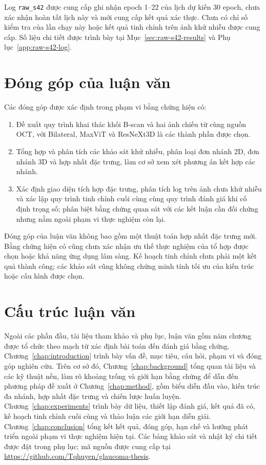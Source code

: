 \documentclass[14pt,a4paper,oneside]{extreport}
\begin{document}
Log \texttt{raw\_s42} được cung cấp ghi nhận epoch 1--22 của lịch dự
kiến 30 epoch, chưa xác nhận hoàn tất lịch này và mới cung cấp kết quả
xác thực. Chưa có chỉ số kiểm tra của lần chạy này hoặc kết quả tinh
chỉnh trên ảnh khử nhiễu được cung cấp. Số liệu chi tiết được trình bày tại
Mục~\ref{sec:raw-s42-results} và Phụ lục~\ref{app:raw-s42-log}.

\section{Đóng góp của luận văn}
Các đóng góp được xác định trong phạm vi bằng chứng hiện có:
\begin{enumerate}[label=\arabic*.,leftmargin=1cm]
 \item Đề xuất quy trình khai thác khối B-scan và hai ảnh chiếu từ cùng
 nguồn OCT, với Bilateral, MaxViT và ResNeXt3D là các thành phần được chọn.
 \item Tổng hợp và phân tích các khảo sát khử nhiễu, phân loại đơn nhánh
 2D, đơn nhánh 3D và hợp nhất đặc trưng, làm cơ sở xem xét phương án kết hợp các nhánh.
 \item Xác định giao diện tích hợp đặc trưng, phân tích log trên ảnh chưa
 khử nhiễu và xác lập quy trình tinh chỉnh cuối cùng cùng quy trình
 đánh giá khi cố định trọng số; phân biệt bằng chứng quan sát với các
 kết luận cần đối chứng nhưng nằm ngoài phạm vi thực nghiệm còn lại.
\end{enumerate}
Đóng góp của luận văn không bao gồm một thuật toán hợp nhất đặc trưng mới.
Bằng chứng hiện có cũng chưa xác nhận ưu thế thực nghiệm của tổ hợp
được chọn hoặc khả năng ứng dụng lâm sàng.
Kế hoạch tinh chỉnh chưa phải một kết quả thành công; các khảo sát cũng
không chứng minh tính tối ưu của kiến trúc hoặc cấu hình được chọn.

\section{Cấu trúc luận văn}
Ngoài các phần đầu, tài liệu tham khảo và phụ lục, luận văn gồm năm
chương được tổ chức theo mạch từ xác định bài toán đến đánh giá bằng
chứng. Chương~\ref{chap:introduction} trình bày vấn đề, mục tiêu, câu hỏi,
phạm vi và đóng góp nghiên cứu. Trên cơ sở đó, Chương~\ref{chap:background}
tổng quan tài liệu và các kỹ thuật nền, làm rõ khoảng trống và giới hạn
bằng chứng để dẫn đến phương pháp đề xuất ở Chương~\ref{chap:method},
gồm biểu diễn đầu vào, kiến trúc đa nhánh, hợp nhất đặc trưng và chiến
lược huấn luyện. Chương~\ref{chap:experiments} trình bày dữ liệu, thiết
lập đánh giá, kết quả đã có, kế hoạch tinh chỉnh cuối cùng và thảo luận
các giới hạn diễn giải. Chương~\ref{chap:conclusion} tổng kết kết quả,
đóng góp, hạn chế và hướng phát triển ngoài phạm vi thực nghiệm hiện tại.
Các bảng khảo sát và nhật ký chi tiết được đặt trong phụ lục; mã nguồn
được cung cấp tại \url{https://github.com/Tqhuyen/glaucoma-thesis}.
\end{document}

